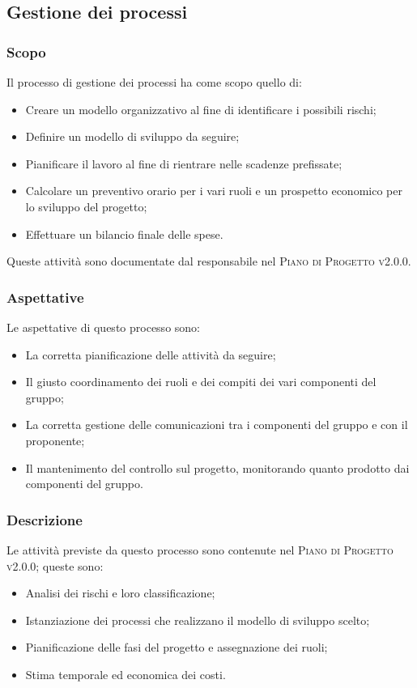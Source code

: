 \documentclass[../norme-di-progetto.tex]{subfiles}
\begin{document}
\subsection{Gestione dei processi}
\subsubsection{Scopo}
Il processo di gestione dei processi ha come scopo quello di:
\begin{itemize}
  \item Creare un modello organizzativo al fine di identificare i possibili rischi;
  \item Definire un modello di sviluppo da seguire;
  \item Pianificare il lavoro al fine di rientrare nelle scadenze prefissate;
  \item Calcolare un preventivo orario per i vari ruoli e un prospetto economico per lo sviluppo del progetto;
  \item Effettuare un bilancio finale delle spese.
\end{itemize}
Queste attività sono documentate dal responsabile nel \textsc{Piano di Progetto v2.0.0}.

\subsubsection{Aspettative}
Le aspettative di questo processo sono:
\begin{itemize}
  \item La corretta pianificazione delle attività da seguire;
  \item Il giusto coordinamento dei ruoli e dei compiti dei vari componenti del gruppo;
  \item La corretta gestione delle comunicazioni tra i componenti del gruppo e con il proponente;
  \item Il mantenimento del controllo sul progetto, monitorando quanto prodotto dai componenti del gruppo.
\end{itemize}

\subsubsection{Descrizione}
Le attività previste da questo processo sono contenute nel \textsc{Piano di Progetto v2.0.0}; queste sono:
\begin{itemize}
  \item Analisi dei rischi e loro classificazione;
  \item Istanziazione dei processi che realizzano il modello di sviluppo scelto;
  \item Pianificazione delle fasi del progetto e assegnazione dei ruoli;
  \item Stima temporale ed economica dei costi.
\end{itemize}
\end{document}
